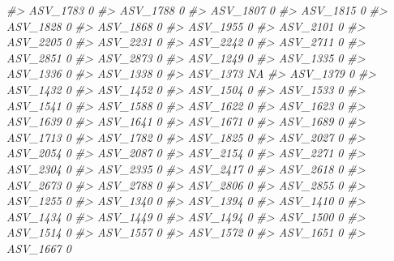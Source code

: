 \documentclass[
]{article}
\newenvironment{Shaded}{\begin{snugshade}}{\end{snugshade}}
\newcommand{\CommentTok}[1]{\textcolor[rgb]{0.56,0.35,0.01}{\textit{#1}}}
\begin{document}
\begin{Shaded}
\begin{Highlighting}[]
\CommentTok{\#\textgreater{} ASV\_1783  0}
\CommentTok{\#\textgreater{} ASV\_1788  0}
\CommentTok{\#\textgreater{} ASV\_1807  0}
\CommentTok{\#\textgreater{} ASV\_1815  0}
\CommentTok{\#\textgreater{} ASV\_1828  0}
\CommentTok{\#\textgreater{} ASV\_1868  0}
\CommentTok{\#\textgreater{} ASV\_1955  0}
\CommentTok{\#\textgreater{} ASV\_2101  0}
\CommentTok{\#\textgreater{} ASV\_2205  0}
\CommentTok{\#\textgreater{} ASV\_2231  0}
\CommentTok{\#\textgreater{} ASV\_2242  0}
\CommentTok{\#\textgreater{} ASV\_2711  0}
\CommentTok{\#\textgreater{} ASV\_2851  0}
\CommentTok{\#\textgreater{} ASV\_2873  0}
\CommentTok{\#\textgreater{} ASV\_1249  0}
\CommentTok{\#\textgreater{} ASV\_1335  0}
\CommentTok{\#\textgreater{} ASV\_1336  0}
\CommentTok{\#\textgreater{} ASV\_1338  0}
\CommentTok{\#\textgreater{} ASV\_1373 NA}
\CommentTok{\#\textgreater{} ASV\_1379  0}
\CommentTok{\#\textgreater{} ASV\_1432  0}
\CommentTok{\#\textgreater{} ASV\_1452  0}
\CommentTok{\#\textgreater{} ASV\_1504  0}
\CommentTok{\#\textgreater{} ASV\_1533  0}
\CommentTok{\#\textgreater{} ASV\_1541  0}
\CommentTok{\#\textgreater{} ASV\_1588  0}
\CommentTok{\#\textgreater{} ASV\_1622  0}
\CommentTok{\#\textgreater{} ASV\_1623  0}
\CommentTok{\#\textgreater{} ASV\_1639  0}
\CommentTok{\#\textgreater{} ASV\_1641  0}
\CommentTok{\#\textgreater{} ASV\_1671  0}
\CommentTok{\#\textgreater{} ASV\_1689  0}
\CommentTok{\#\textgreater{} ASV\_1713  0}
\CommentTok{\#\textgreater{} ASV\_1782  0}
\CommentTok{\#\textgreater{} ASV\_1825  0}
\CommentTok{\#\textgreater{} ASV\_2027  0}
\CommentTok{\#\textgreater{} ASV\_2054  0}
\CommentTok{\#\textgreater{} ASV\_2087  0}
\CommentTok{\#\textgreater{} ASV\_2154  0}
\CommentTok{\#\textgreater{} ASV\_2271  0}
\CommentTok{\#\textgreater{} ASV\_2304  0}
\CommentTok{\#\textgreater{} ASV\_2335  0}
\CommentTok{\#\textgreater{} ASV\_2417  0}
\CommentTok{\#\textgreater{} ASV\_2618  0}
\CommentTok{\#\textgreater{} ASV\_2673  0}
\CommentTok{\#\textgreater{} ASV\_2788  0}
\CommentTok{\#\textgreater{} ASV\_2806  0}
\CommentTok{\#\textgreater{} ASV\_2855  0}
\CommentTok{\#\textgreater{} ASV\_1255  0}
\CommentTok{\#\textgreater{} ASV\_1340  0}
\CommentTok{\#\textgreater{} ASV\_1394  0}
\CommentTok{\#\textgreater{} ASV\_1410  0}
\CommentTok{\#\textgreater{} ASV\_1434  0}
\CommentTok{\#\textgreater{} ASV\_1449  0}
\CommentTok{\#\textgreater{} ASV\_1494  0}
\CommentTok{\#\textgreater{} ASV\_1500  0}
\CommentTok{\#\textgreater{} ASV\_1514  0}
\CommentTok{\#\textgreater{} ASV\_1557  0}
\CommentTok{\#\textgreater{} ASV\_1572  0}
\CommentTok{\#\textgreater{} ASV\_1651  0}
\CommentTok{\#\textgreater{} ASV\_1667  0}

\end{Highlighting}
\end{Shaded}
\end{document}
